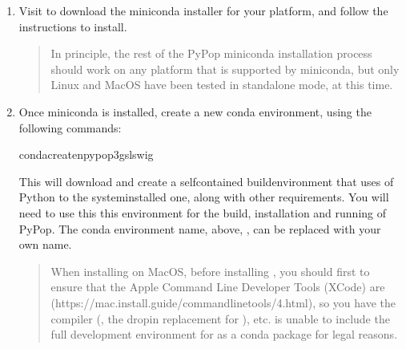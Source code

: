 \documentclass[letterpaper,10pt,english,openany,oneside]{sphinxmanual}
\begin{document}
\label{\detokenize{docs/guide-chapter-contributing:install-build-environment-via-miniconda-recommended}}\begin{enumerate}
%
\item {} 
\sphinxAtStartPar
Visit  to download the
miniconda installer for your platform, and follow the instructions to
install.
\begin{quote}

\sphinxAtStartPar
In principle, the rest of the PyPop miniconda installation process
should work on any platform that is supported by miniconda, but
only Linux and MacOS have been tested in standalone mode, at this
time.
\end{quote}

\item {} 
\sphinxAtStartPar
Once miniconda is installed, create a new conda environment, using
the following commands:

\begin{sphinxVerbatim}[commandchars=\\\{\}]
condacreate\PYGZhy{}npypop3gslswig
\end{sphinxVerbatim}

\sphinxAtStartPar
This will download and create a self\sphinxhyphen{}contained build\sphinxhyphen{}environment that
uses of Python to the system\sphinxhyphen{}installed one, along with other
requirements. You will need to use this this environment for the
build, installation and running of PyPop. The conda environment name,
above, , can be replaced with your own name.
\begin{quote}

\sphinxAtStartPar
When installing on MacOS, before installing , you should
first to ensure that the Apple Command Line Developer Tools
(XCode) are
 (https://mac.install.guide/commandlinetools/4.html),
so you have the compiler (, the drop\sphinxhyphen{}in replacement for
),  etc.  is unable to include the full
development environment for  as a conda package for legal
reasons.
\end{quote}


\end{enumerate}
\end{document}
